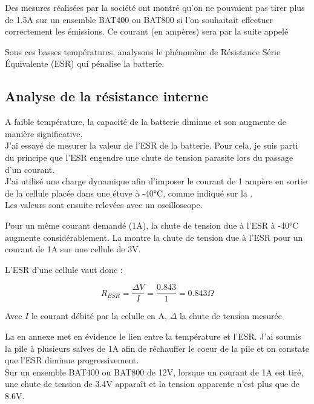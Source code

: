 Des mesures réalisées par la société ont montré qu'on ne pouvaient pas tirer plus de 1.5A sur un ensemble BAT400 ou BAT800 si l'on souhaitait effectuer correctement les émissions.
Ce courant (en ampères) sera par la suite appelé 

Sous ces basses températures, analysons le phénomène de Résistance Série Équivalente (ESR) qui pénalise la batterie.

\subsection{Analyse de la résistance interne}

A faible température, la capacité de la batterie diminue et son  augmente de manière significative. \\

J'ai essayé de mesurer la valeur de l'ESR de la batterie. Pour cela, je suis parti du principe que l'ESR engendre une chute de tension parasite lors du passage d'un courant. \\
J'ai utilisé une charge dynamique afin d'imposer le courant de 1 ampère en sortie de la cellule placée dans une étuve à -40°C, comme indiqué sur la .\\ Les valeurs sont ensuite relevées avec un oscilloscope.


Pour un même courant demandé (1A), la chute de tension due à l'ESR à -40°C augmente considérablement. La  montre la chute de tension due à l'ESR pour un courant de 1A sur une cellule de 3V.


L'ESR d'une cellule vaut donc :

$$ R_{ESR} = \frac{\Delta V}{I} = \frac{0.843}{1} = 0.843 \Omega$$

Avec $I$ le courant débité par la celulle en A, $\Delta $ la chute de tension mesurée


La  en annexe met en évidence le lien entre la température et l'ESR. J'ai soumis la pile à plusieurs salves de 1A afin de réchauffer le coeur de la pile et on constate que l'ESR diminue progressivement.\\

Sur un ensemble BAT400 ou BAT800 de 12V, lorsque un courant de 1A est tiré, une chute de tension de 3.4V apparaît et la tension apparente n'est plus que de 8.6V.\\


